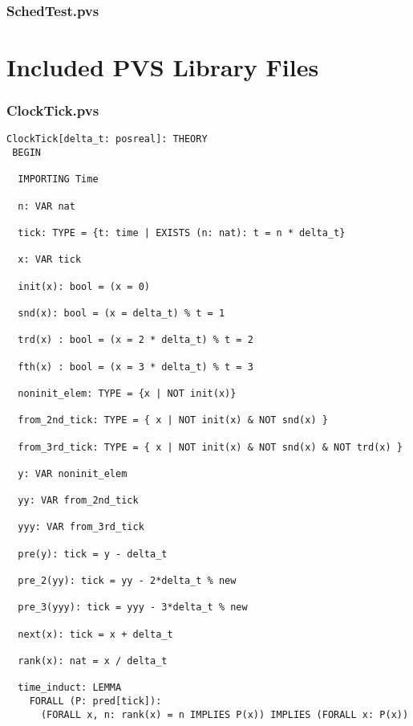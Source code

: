\begin{singlespace}
\subsection{SchedTest.pvs} \label{app:schedex:pvsgen:top}






\chapter{Included PVS Library Files} \label{app:schedex:pvslib}

\subsection{ClockTick.pvs} \label{app:schedex:pvslib:clock}

\begin{lstlisting}[tabsize=2, language=PVS]
ClockTick[delta_t: posreal]: THEORY
 BEGIN

  IMPORTING Time

  n: VAR nat

  tick: TYPE = {t: time | EXISTS (n: nat): t = n * delta_t}

  x: VAR tick

  init(x): bool = (x = 0)

  snd(x): bool = (x = delta_t) % t = 1

  trd(x) : bool = (x = 2 * delta_t) % t = 2

  fth(x) : bool = (x = 3 * delta_t) % t = 3

  noninit_elem: TYPE = {x | NOT init(x)}

  from_2nd_tick: TYPE = { x | NOT init(x) & NOT snd(x) }

  from_3rd_tick: TYPE = { x | NOT init(x) & NOT snd(x) & NOT trd(x) }

  y: VAR noninit_elem

  yy: VAR from_2nd_tick

  yyy: VAR from_3rd_tick

  pre(y): tick = y - delta_t

  pre_2(yy): tick = yy - 2*delta_t % new

  pre_3(yyy): tick = yyy - 3*delta_t % new

  next(x): tick = x + delta_t

  rank(x): nat = x / delta_t

  time_induct: LEMMA
    FORALL (P: pred[tick]):
      (FORALL x, n: rank(x) = n IMPLIES P(x)) IMPLIES (FORALL x: P(x))


\end{lstlisting}
\end{singlespace}
